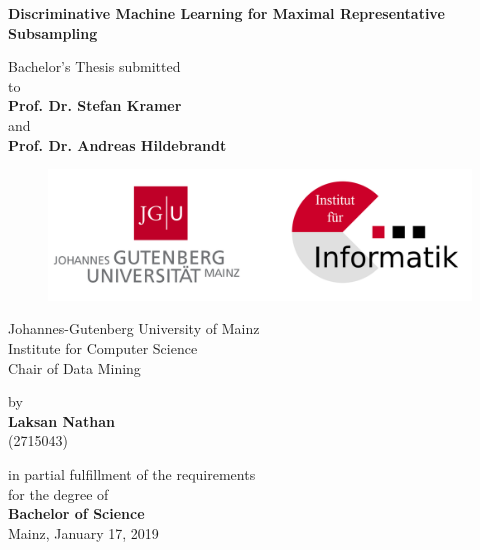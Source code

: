 \begin{center}

{\LARGE{\bf Discriminative Machine Learning for Maximal Representative Subsampling}} \vspace{1.0cm}



    {\normalsize Bachelor's Thesis submitted\\\vspace{0.5cm}
    to}\\\vspace{0.5cm}
    {\normalsize{\bf Prof. Dr. Stefan Kramer}} \\
    and \\
    {\normalsize{\bf Prof. Dr. Andreas Hildebrandt}} \\\vspace{1cm}
\begin{figure}[ht]
	\begin{center}
		\includegraphics[scale=0.20,angle=0]{fig/jgu}
	\end{center}
\end{figure}

    {\normalsize Johannes-Gutenberg University of Mainz \\
    Institute for Computer Science \\
    Chair of Data Mining\vspace{0.5cm}} 



    {\normalsize by \\
    {\bf Laksan Nathan} \\
    (2715043)} \vspace{1cm}


    {\normalsize in partial fulfillment of the requirements \\
    for the degree of \\
    {\bf Bachelor of Science} \\
    Mainz, January 17, 2019}

\end{center}
